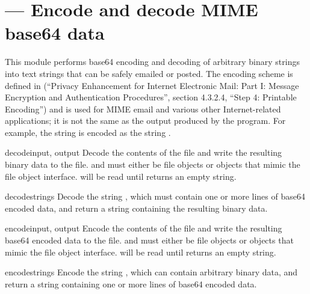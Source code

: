 \section{ ---
         Encode and decode MIME base64 data}




This module performs base64 encoding and decoding of arbitrary binary
strings into text strings that can be safely emailed or posted.  The
encoding scheme is defined in  (``Privacy Enhancement for
Internet Electronic Mail: Part I: Message Encryption and
Authentication Procedures'', section 4.3.2.4, ``Step 4: Printable
Encoding'') and is used for MIME email and
various other Internet-related applications; it is not the same as the
output produced by the  program.  For example, the
string  is encoded as the string
.  


\begin{funcdesc}{decode}{input, output}
Decode the contents of the  file and write the resulting
binary data to the  file.
 and  must either be file objects or objects that
mimic the file object interface.  will be read until
 returns an empty string.
\end{funcdesc}

\begin{funcdesc}{decodestring}{s}
Decode the string , which must contain one or more lines of
base64 encoded data, and return a string containing the resulting
binary data.
\end{funcdesc}

\begin{funcdesc}{encode}{input, output}
Encode the contents of the  file and write the resulting
base64 encoded data to the  file.
 and  must either be file objects or objects that
mimic the file object interface.  will be read until
 returns an empty string.
\end{funcdesc}

\begin{funcdesc}{encodestring}{s}
Encode the string , which can contain arbitrary binary data,
and return a string containing one or more lines of
base64 encoded data.
\end{funcdesc}
